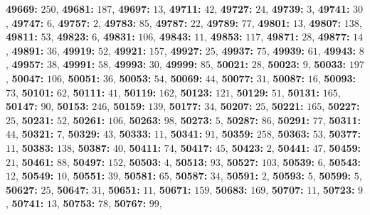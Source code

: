 \textsf{\bfseries 49669:} $250$, \textsf{\bfseries 49681:} $187$, \textsf{\bfseries 49697:} $13$, \textsf{\bfseries 49711:} $42$, \textsf{\bfseries 49727:} $24$, \textsf{\bfseries 49739:} $3$, \textsf{\bfseries 49741:} $30$, \textsf{\bfseries 49747:} $6$, \textsf{\bfseries 49757:} $2$, \textsf{\bfseries 49783:} $85$, \textsf{\bfseries 49787:} $22$, \textsf{\bfseries 49789:} $77$, \textsf{\bfseries 49801:} $13$, \textsf{\bfseries 49807:} $138$, \textsf{\bfseries 49811:} $53$, \textsf{\bfseries 49823:} $6$, \textsf{\bfseries 49831:} $106$, \textsf{\bfseries 49843:} $11$, \textsf{\bfseries 49853:} $117$, \textsf{\bfseries 49871:} $28$, \textsf{\bfseries 49877:} $14$, \textsf{\bfseries 49891:} $36$, \textsf{\bfseries 49919:} $52$, \textsf{\bfseries 49921:} $157$, \textsf{\bfseries 49927:} $25$, \textsf{\bfseries 49937:} $75$, \textsf{\bfseries 49939:} $61$, \textsf{\bfseries 49943:} $8$, \textsf{\bfseries 49957:} $38$, \textsf{\bfseries 49991:} $58$, \textsf{\bfseries 49993:} $30$, \textsf{\bfseries 49999:} $85$, \textsf{\bfseries 50021:} $28$, \textsf{\bfseries 50023:} $9$, \textsf{\bfseries 50033:} $197$, \textsf{\bfseries 50047:} $106$, \textsf{\bfseries 50051:} $36$, \textsf{\bfseries 50053:} $54$, \textsf{\bfseries 50069:} $44$, \textsf{\bfseries 50077:} $31$, \textsf{\bfseries 50087:} $16$, \textsf{\bfseries 50093:} $73$, \textsf{\bfseries 50101:} $62$, \textsf{\bfseries 50111:} $41$, \textsf{\bfseries 50119:} $162$, \textsf{\bfseries 50123:} $121$, \textsf{\bfseries 50129:} $51$, \textsf{\bfseries 50131:} $165$, \textsf{\bfseries 50147:} $90$, \textsf{\bfseries 50153:} $246$, \textsf{\bfseries 50159:} $139$, \textsf{\bfseries 50177:} $34$, \textsf{\bfseries 50207:} $25$, \textsf{\bfseries 50221:} $165$, \textsf{\bfseries 50227:} $25$, \textsf{\bfseries 50231:} $52$, \textsf{\bfseries 50261:} $106$, \textsf{\bfseries 50263:} $98$, \textsf{\bfseries 50273:} $5$, \textsf{\bfseries 50287:} $86$, \textsf{\bfseries 50291:} $77$, \textsf{\bfseries 50311:} $44$, \textsf{\bfseries 50321:} $7$, \textsf{\bfseries 50329:} $43$, \textsf{\bfseries 50333:} $11$, \textsf{\bfseries 50341:} $91$, \textsf{\bfseries 50359:} $258$, \textsf{\bfseries 50363:} $53$, \textsf{\bfseries 50377:} $11$, \textsf{\bfseries 50383:} $138$, \textsf{\bfseries 50387:} $40$, \textsf{\bfseries 50411:} $74$, \textsf{\bfseries 50417:} $45$, \textsf{\bfseries 50423:} $2$, \textsf{\bfseries 50441:} $47$, \textsf{\bfseries 50459:} $21$, \textsf{\bfseries 50461:} $88$, \textsf{\bfseries 50497:} $152$, \textsf{\bfseries 50503:} $4$, \textsf{\bfseries 50513:} $93$, \textsf{\bfseries 50527:} $103$, \textsf{\bfseries 50539:} $6$, \textsf{\bfseries 50543:} $12$, \textsf{\bfseries 50549:} $10$, \textsf{\bfseries 50551:} $39$, \textsf{\bfseries 50581:} $65$, \textsf{\bfseries 50587:} $34$, \textsf{\bfseries 50591:} $2$, \textsf{\bfseries 50593:} $5$, \textsf{\bfseries 50599:} $5$, \textsf{\bfseries 50627:} $25$, \textsf{\bfseries 50647:} $31$, \textsf{\bfseries 50651:} $11$, \textsf{\bfseries 50671:} $159$, \textsf{\bfseries 50683:} $169$, \textsf{\bfseries 50707:} $11$, \textsf{\bfseries 50723:} $9$, \textsf{\bfseries 50741:} $13$, \textsf{\bfseries 50753:} $78$, \textsf{\bfseries 50767:} $99$, 
